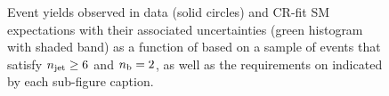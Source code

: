 \begin{figure}[h!]
\begin{center}
    \caption{Event yields observed in data (solid circles) and CR-fit SM expectations with their associated uncertainties (green histogram with shaded band) as a function of \HTmiss based on a sample of events that satisfy $n_{\text{jet}} \geq 6$ and $n_{\text{b}} = 2$, as well as the requirements on \scalht indicated by each sub-figure caption. }
    \label{fig:mhtval_ge6j_eq2b}
  \end{center}
\end{figure}

